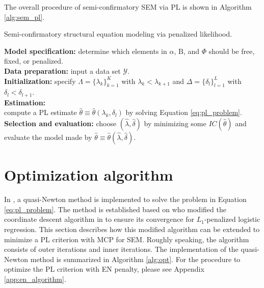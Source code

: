 \documentclass[nojss]{jss}
\begin{document}
The overall procedure of semi-confirmatory SEM via PL is shown in Algorithm \ref{alg:sem_pl}.

\begin{algorithm}[htb]
  \caption{Semi-confirmatory structural equation modeling via penalized likelihood.}
  \label{alg:sem_pl}
\textbf{Model specification:} determine which elements in $\alpha$, $\mathrm{B}$, and $\Phi$ should be free, fixed, or penalized. \\
\textbf{Data preparation:} input a data set $\mathcal{Y}$.\\
\textbf{Initialization:} specify $\Lambda=\{ \lambda_k\}_{k=1}^K$ with $\lambda_{k}<\lambda_{k+1}$ and $\Delta=\{ \delta_l\}_{l=1}^L$ with $\delta_{l}<\delta_{l+1}$. \\
\textbf{Estimation:} \\
  {
  {
  compute a PL estimate $\hat{\theta}  \equiv  \hat{\theta}(\lambda_k,\delta_l)$ by solving Equation \ref{eq:pl_problem}.
  }
  }
\textbf{Selection and evaluation:} choose $(\hat{\lambda},\hat{\delta})$ by minimizing some $IC(\hat{\theta})$ and evaluate the model made by $\hat{\theta} \equiv \hat{\theta}(\hat{\lambda},\hat{\delta})$.
\end{algorithm}


\section{Optimization algorithm} \label{sec:opt}
In , a quasi-Newton method is implemented to solve the problem in Equation \ref{eq:pl_problem}. The method is established based on \cite{Yuan:2012:IGL:2503308.2343708} who modified the coordinate descent algorithm in  \citep{Friedman2010} to ensure its convergence for $L_1$-penalized logistic regression. This section describes how this modified algorithm can be extended to minimize a PL criterion with MCP for SEM. Roughly speaking, the algorithm consists of outer iterations and inner iterations. The implementation of the quasi-Newton method is summarized in Algorithm \ref{alg:opt}. For the procedure to optimize the PL criterion with EN penalty, please see Appendix \ref{app:en_algorithm}.
\end{document}
